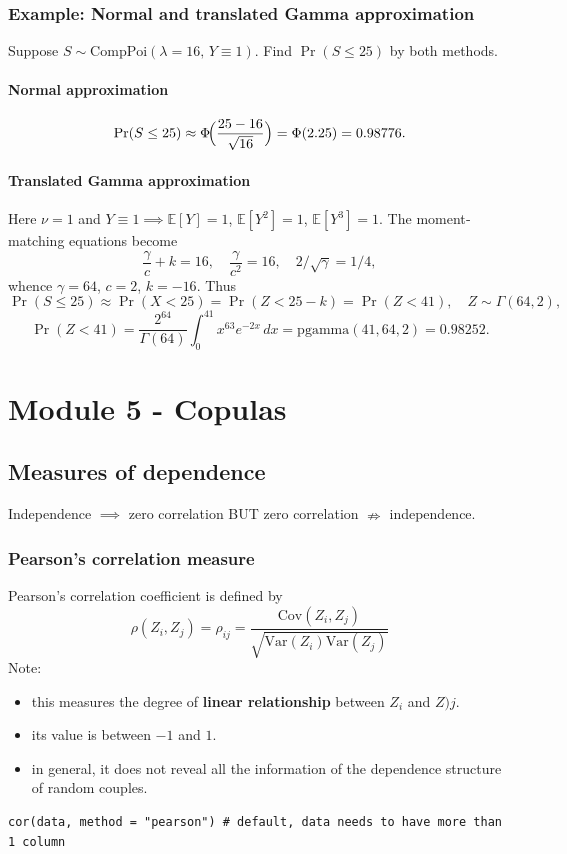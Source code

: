 \documentclass[11pt]{article}
\newcommand{\noi}{\noindent}
\begin{document}
\subsubsection*{Example: Normal and translated Gamma approximation}

Suppose \(S\sim\mathrm{CompPoi}(\lambda=16,\,Y\equiv1)\).  Find \(\Pr(S\le25)\) by both methods.

\paragraph{Normal approximation}
\[
\Pr(S\le25)
\approx \Phi\!\Bigl(\frac{25-16}{\sqrt{16}}\Bigr)
=\Phi(2.25)
=0.98776.
\]

\paragraph{Translated Gamma approximation}
Here \(\nu=1\) and \(Y\equiv1\implies\mathbb{E}[Y]=1\), \(\mathbb{E}[Y^2]=1\), \(\mathbb{E}[Y^3]=1\).  The moment‐matching equations become
\[
\frac{\gamma}{c}+k=16,
\quad
\frac{\gamma}{c^2}=16,
\quad
2/\sqrt{\gamma}=1/4,
\]
whence
\(\gamma=64\), \(c=2\), \(k=-16\).  Thus
\[
\Pr(S\le25)
\approx \Pr(X<25)=\Pr(Z<25-k)=\Pr(Z<41),
\quad Z\sim\Gamma(64,2),
\]
\[
\Pr(Z<41)
=\frac{2^{64}}{\Gamma(64)}\int_{0}^{41}x^{63}e^{-2x}\,dx
=\mathrm{pgamma}(41,64,2)
=0.98252.
\]


\newpage
\section{Module 5 - Copulas}
\subsection{Measures of dependence}
Independence $\implies$ zero correlation BUT zero correlation $\nRightarrow$ independence.

\subsubsection{Pearson's correlation measure}
\noi Pearson's correlation coefficient is defined by
$$\rho(Z_i, Z_j) = \rho_{ij} = \frac{\text{Cov}(Z_i, Z_j)}{\sqrt{\text{Var}(Z_i)\text{Var}(Z_j)}}$$
\noi Note:
\begin{itemize}
    \item this measures the degree of \textbf{linear relationship} between $Z_i$ and $Z)j$.
    \item its value is between $-1$ and $1$.
    \item in general, it does not reveal all the information of the dependence structure of random couples.
\end{itemize}
\begin{lstlisting}
cor(data, method = "pearson") # default, data needs to have more than 1 column
\end{lstlisting}
\end{document}
